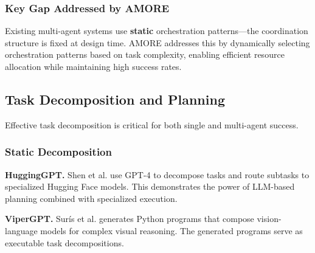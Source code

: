 \documentclass{article}
\theoremstyle{plain}
\theoremstyle{definition}
\theoremstyle{remark}
\begin{document}
\subsubsection{Key Gap Addressed by AMORE}

Existing multi-agent systems use \textbf{static} orchestration patterns---the coordination structure is fixed at design time. AMORE addresses this by dynamically selecting orchestration patterns based on task complexity, enabling efficient resource allocation while maintaining high success rates.


\subsection{Task Decomposition and Planning}
\label{sec:related_decomposition}

Effective task decomposition is critical for both single and multi-agent success.

\subsubsection{Static Decomposition}

\textbf{HuggingGPT.} Shen et al. \citep{shen2023hugginggpt} use GPT-4 to decompose tasks and route subtasks to specialized Hugging Face models. This demonstrates the power of LLM-based planning combined with specialized execution.

\textbf{ViperGPT.} Surís et al. \citep{suris2023vipergpt} generates Python programs that compose vision-language models for complex visual reasoning. The generated programs serve as executable task decompositions.
\end{document}
